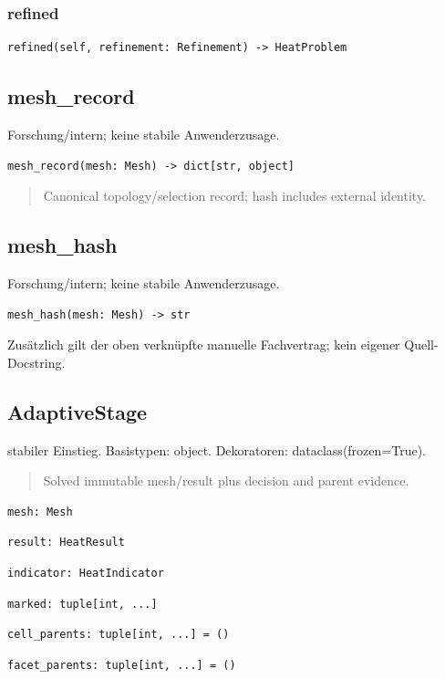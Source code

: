 \subsubsection*{refined}
\begin{lstlisting}
refined(self, refinement: Refinement) -> HeatProblem
\end{lstlisting}
\subsection{mesh\_record}
Forschung/intern; keine stabile Anwenderzusage.
\begin{lstlisting}
mesh_record(mesh: Mesh) -> dict[str, object]
\end{lstlisting}
\begin{quote}
Canonical topology/selection record; hash includes external identity.
\end{quote}
\subsection{mesh\_hash}
Forschung/intern; keine stabile Anwenderzusage.
\begin{lstlisting}
mesh_hash(mesh: Mesh) -> str
\end{lstlisting}
Zusätzlich gilt der oben verknüpfte manuelle Fachvertrag; kein eigener Quell-Docstring.
\subsection{AdaptiveStage}
stabiler Einstieg.
Basistypen: object. Dekoratoren: dataclass(frozen=True).
\begin{quote}
Solved immutable mesh/result plus decision and parent evidence.
\end{quote}
\begin{lstlisting}
mesh: Mesh
\end{lstlisting}
\begin{lstlisting}
result: HeatResult
\end{lstlisting}
\begin{lstlisting}
indicator: HeatIndicator
\end{lstlisting}
\begin{lstlisting}
marked: tuple[int, ...]
\end{lstlisting}
\begin{lstlisting}
cell_parents: tuple[int, ...] = ()
\end{lstlisting}
\begin{lstlisting}
facet_parents: tuple[int, ...] = ()
\end{lstlisting}
